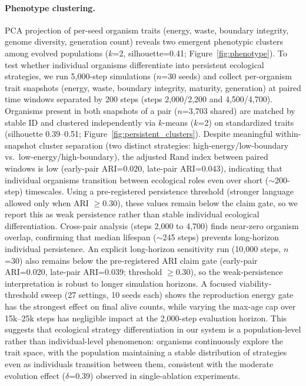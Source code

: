 \documentclass[letterpaper]{article}
\begin{document}
\paragraph{Phenotype clustering.}
PCA projection of per-seed organism traits (energy, waste, boundary
integrity, genome diversity, generation count) reveals two emergent
phenotypic clusters among evolved populations ($k$=2, silhouette=0.41;
Figure~\ref{fig:phenotype}).
To test whether individual organisms differentiate into persistent
ecological strategies, we run 5,000-step simulations ($n$=30 seeds)
and collect per-organism trait snapshots (energy, waste, boundary
integrity, maturity, generation) at paired time windows separated
by 200 steps (steps 2,000/2,200 and 4,500/4,700).
Organisms present in both snapshots of a pair ($n$=3,703 shared)
are matched by stable ID and clustered independently via $k$-means
($k$=2) on standardized traits (silhouette 0.39--0.51;
Figure~\ref{fig:persistent_clusters}).
Despite meaningful within-snapshot cluster separation (two distinct
strategies: high-energy/low-boundary vs.\ low-energy/high-boundary),
the adjusted Rand index between paired windows is low
(early-pair ARI=0.020, late-pair ARI=0.043),
indicating that individual organisms transition between ecological
roles even over short ($\sim$200-step) timescales.
Using a pre-registered persistence threshold (stronger language allowed
only when ARI $\geq 0.30$), these values remain below the claim gate,
so we report this as weak persistence rather than stable individual
ecological differentiation.
Cross-pair analysis (steps 2,000 to 4,700) finds near-zero organism
overlap, confirming that median lifespan ($\sim$245 steps) prevents
long-horizon individual persistence.
An explicit long-horizon sensitivity run (10,000 steps, $n$=30)
also remains below the pre-registered ARI claim gate
(early-pair ARI=0.020, late-pair ARI=0.039; threshold $\geq 0.30$),
so the weak-persistence interpretation is robust to longer simulation horizons.
A focused viability-threshold sweep (27 settings, 10 seeds each) shows
the reproduction energy gate has the strongest effect on final alive counts,
while varying the max-age cap over 15k--25k steps has negligible impact
at the 2,000-step evaluation horizon.
This suggests that ecological strategy differentiation in our system
is a population-level rather than individual-level phenomenon:
organisms continuously explore the trait space, with the population
maintaining a stable distribution of strategies even as individuals
transition between them, consistent with the moderate evolution
effect ($\delta$=0.39) observed in single-ablation experiments.
\end{document}
